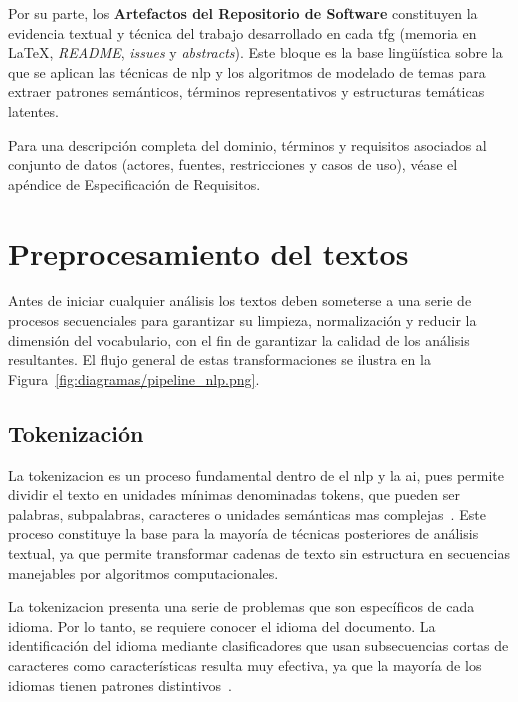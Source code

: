 Por su parte, los \textbf{Artefactos del Repositorio de Software} constituyen
la evidencia textual y técnica del trabajo desarrollado en cada \acrshort{tfg}
(memoria en \LaTeX{}, \textit{README}, \textit{issues} y \textit{abstracts}).
Este bloque es la base lingüística sobre la que se aplican las técnicas de
\acrshort{nlp} y los algoritmos de modelado de temas para extraer patrones
semánticos, términos representativos y estructuras temáticas latentes.

Para una descripción completa del dominio, términos y requisitos asociados al
conjunto de datos (actores, fuentes, restricciones y casos de uso), véase el
apéndice de Especificación de Requisitos.

\section{Preprocesamiento del textos}

Antes de iniciar cualquier análisis los textos deben someterse a una serie de
procesos secuenciales para garantizar su limpieza, normalización y reducir la
dimensión del vocabulario, con el fin de garantizar la calidad de los análisis
resultantes. El flujo general de estas transformaciones se ilustra en la
Figura~\ref{fig:diagramas/pipeline_nlp.png}.


\subsection{Tokenización}
La \gls{tokenizacion} es un proceso fundamental dentro de el \acrshort{nlp} y
la \acrshort{ai}, pues permite dividir el texto en unidades mínimas denominadas
tokens, que pueden ser palabras, subpalabras, caracteres o unidades semánticas
mas complejas~\cite{jm3}. Este proceso constituye la base para la mayoría de
técnicas posteriores de análisis textual, ya que permite transformar cadenas de
texto sin estructura en secuencias manejables por algoritmos computacionales.

La \gls{tokenizacion} presenta una serie de problemas que son específicos de
cada idioma. Por lo tanto, se requiere conocer el idioma del documento. La
identificación del idioma mediante clasificadores que usan subsecuencias cortas
de caracteres como características resulta muy efectiva, ya que la mayoría de
los idiomas tienen patrones distintivos~\cite{QueEsTokenizacion}.

